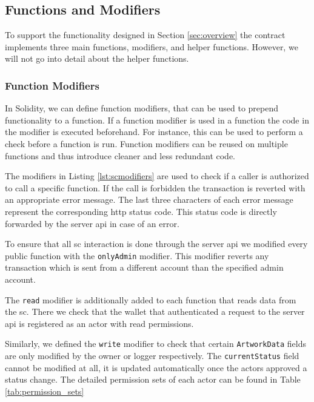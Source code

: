 

\subsection{Functions and Modifiers}
To support the functionality designed in Section \ref{sec:overview} the contract implements three main functions, modifiers, and helper functions. However, we will not go into detail about the helper functions.

\subsubsection{Function Modifiers}
In Solidity, we can define function modifiers, that can be used to prepend functionality to a function. If a function modifier is used in a function the code in the modifier is executed beforehand. For instance, this can be used to perform a check before a function is run. Function modifiers can be reused on multiple functions and thus introduce cleaner and less redundant code.



The modifiers in Listing \ref{lst:scmodifiers} are used to check if a caller is authorized to call a specific function. If the call is forbidden the transaction is reverted with an appropriate error message. The last three characters of each error message represent the corresponding \gls{http} status code. This status code is directly forwarded by the server \gls{api} in case of an error.

To ensure that all \gls{sc} interaction is done through the server \gls{api} we modified every public function with the \texttt{onlyAdmin} modifier. This modifier reverts any transaction which is sent from a different account than the specified admin account.

The \texttt{read} modifier is additionally added to each function that reads data from the \gls{sc}. There we check that the wallet that authenticated a request to the server \gls{api} is registered as an actor with read permissions.

Similarly, we defined the \texttt{write} modifier to check that certain \texttt{ArtworkData} fields are only modified by the owner or logger respectively. The \texttt{currentStatus} field cannot be modified at all, it is updated automatically once the actors approved a status change. The detailed permission sets of each actor can be found in Table \ref{tab:permission_sets}

